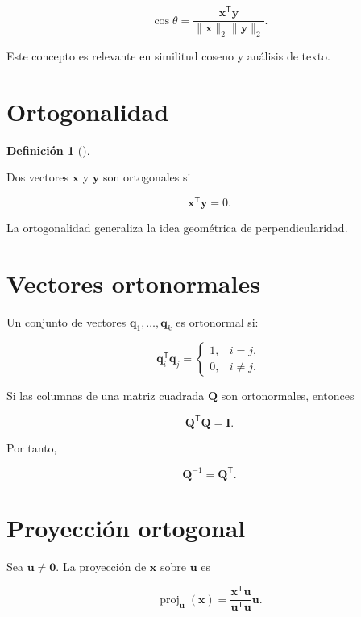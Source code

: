 \documentclass[
  spanish,
  11pt,
  letterpaper,
  DIV=11,
  numbers=noendperiod]{scrreprt}
\theoremstyle{definition}
\newtheorem{definition}{Definición}[chapter]
\theoremstyle{plain}
\theoremstyle{definition}
\theoremstyle{remark}
\begin{document}
\[
\cos\theta
=
\frac{
\mathbf{x}^{\mathsf T}\mathbf{y}
}{
\|\mathbf{x}\|_2\|\mathbf{y}\|_2
}.
\]

Este concepto es relevante en similitud coseno y análisis de texto.

\section{Ortogonalidad}\label{ortogonalidad}

\begin{definition}[]\protect\hypertarget{def-ortogonalidad}{}\label{def-ortogonalidad}

Dos vectores \(\mathbf{x}\) y \(\mathbf{y}\) son ortogonales si

\[
\mathbf{x}^{\mathsf T}\mathbf{y}=0.
\]

\end{definition}

La ortogonalidad generaliza la idea geométrica de perpendicularidad.

\section{Vectores ortonormales}\label{vectores-ortonormales}

Un conjunto de vectores \(\mathbf{q}_1,\ldots,\mathbf{q}_k\) es
ortonormal si:

\[
\mathbf{q}_i^{\mathsf T}\mathbf{q}_j
=
\begin{cases}
1, & i=j,\\
0, & i\neq j.
\end{cases}
\]

Si las columnas de una matriz cuadrada \(\mathbf{Q}\) son ortonormales,
entonces

\[
\mathbf{Q}^{\mathsf T}\mathbf{Q}
=
\mathbf{I}.
\]

Por tanto,

\[
\mathbf{Q}^{-1}
=
\mathbf{Q}^{\mathsf T}.
\]

\section{Proyección ortogonal}\label{proyecciuxf3n-ortogonal}

Sea \(\mathbf{u}\neq\mathbf{0}\). La proyección de \(\mathbf{x}\) sobre
\(\mathbf{u}\) es

\[
\operatorname{proj}_{\mathbf{u}}(\mathbf{x})
=
\frac{
\mathbf{x}^{\mathsf T}\mathbf{u}
}{
\mathbf{u}^{\mathsf T}\mathbf{u}
}
\mathbf{u}.
\]
\end{document}
